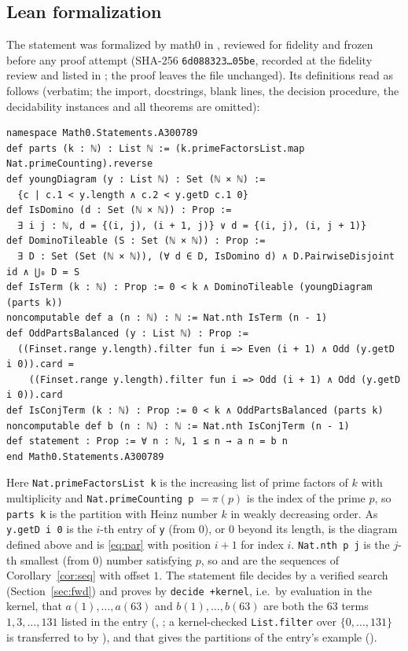\documentclass[11pt]{amsart}
\theoremstyle{plain}
\theoremstyle{definition}
\begin{document}
\subsection*{Lean formalization}
The statement was formalized by math0 in , reviewed for fidelity and frozen before any proof attempt (SHA-256 \texttt{6d088323\ldots 05be}, recorded at the fidelity review and listed in ; the proof leaves the file unchanged). Its definitions read as follows (verbatim; the import, docstrings, blank lines, the decision procedure, the decidability instances and all theorems are omitted):
\begin{lstlisting}
namespace Math0.Statements.A300789
def parts (k : ℕ) : List ℕ := (k.primeFactorsList.map Nat.primeCounting).reverse
def youngDiagram (y : List ℕ) : Set (ℕ × ℕ) :=
  {c | c.1 < y.length ∧ c.2 < y.getD c.1 0}
def IsDomino (d : Set (ℕ × ℕ)) : Prop :=
  ∃ i j : ℕ, d = {(i, j), (i + 1, j)} ∨ d = {(i, j), (i, j + 1)}
def DominoTileable (S : Set (ℕ × ℕ)) : Prop :=
  ∃ D : Set (Set (ℕ × ℕ)), (∀ d ∈ D, IsDomino d) ∧ D.PairwiseDisjoint id ∧ ⋃₀ D = S
def IsTerm (k : ℕ) : Prop := 0 < k ∧ DominoTileable (youngDiagram (parts k))
noncomputable def a (n : ℕ) : ℕ := Nat.nth IsTerm (n - 1)
def OddPartsBalanced (y : List ℕ) : Prop :=
  ((Finset.range y.length).filter fun i => Even (i + 1) ∧ Odd (y.getD i 0)).card =
    ((Finset.range y.length).filter fun i => Odd (i + 1) ∧ Odd (y.getD i 0)).card
def IsConjTerm (k : ℕ) : Prop := 0 < k ∧ OddPartsBalanced (parts k)
noncomputable def b (n : ℕ) : ℕ := Nat.nth IsConjTerm (n - 1)
def statement : Prop := ∀ n : ℕ, 1 ≤ n → a n = b n
end Math0.Statements.A300789
\end{lstlisting}
Here \texttt{Nat.primeFactorsList k} is the increasing list of prime factors of $k$ with multiplicity and \texttt{Nat.primeCounting p} $=\pi(p)$ is the index of the prime $p$, so \texttt{parts k} is the partition with Heinz number $k$ in weakly decreasing order. As \texttt{y.getD i 0} is the $i$-th entry of \texttt{y} (from $0$), or $0$ beyond its length,  is the diagram defined above and  is \eqref{eq:par} with position $i+1$ for index $i$. \texttt{Nat.nth p j} is the $j$-th smallest (from $0$) number satisfying $p$, so  and  are the sequences of Corollary~\ref{cor:seq} with offset $1$.
The statement file decides  by a verified search (Section~\ref{sec:fwd}) and proves by \texttt{decide +kernel}, i.e.\ by evaluation in the kernel, that $a(1),\dots,a(63)$ and $b(1),\dots,b(63)$ are both the $63$ terms $1,3,\dots,131$ listed in the entry (, ; a kernel-checked \texttt{List.filter} over $\{0,\dots,131\}$ is transferred to  by ), and that  gives the partitions of the entry's example ().
\end{document}

